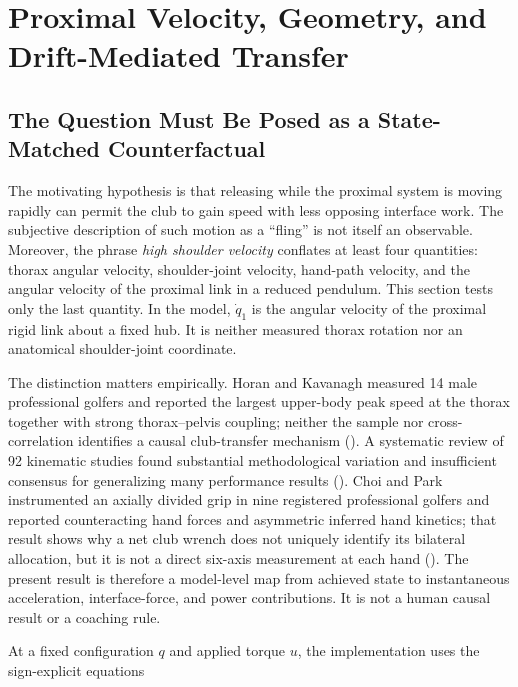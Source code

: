 \documentclass[
  letterpaper,
]{report}
\begin{document}
\chapter{Proximal Velocity, Geometry, and Drift-Mediated
Transfer}\label{sec-shoulder-velocity-transfer}

\section{The Question Must Be Posed as a State-Matched
Counterfactual}\label{the-question-must-be-posed-as-a-state-matched-counterfactual}

The motivating hypothesis is that releasing while the proximal system is
moving rapidly can permit the club to gain speed with less opposing
interface work. The subjective description of such motion as a ``fling''
is not itself an observable. Moreover, the phrase \emph{high shoulder
velocity} conflates at least four quantities: thorax angular velocity,
shoulder-joint velocity, hand-path velocity, and the angular velocity of
the proximal link in a reduced pendulum. This section tests only the
last quantity. In the model, \(\dot q_1\) is the angular velocity of the
proximal rigid link about a fixed hub. It is neither measured thorax
rotation nor an anatomical shoulder-joint coordinate.

The distinction matters empirically. Horan and Kavanagh measured 14 male
professional golfers and reported the largest upper-body peak speed at
the thorax together with strong thorax--pelvis coupling; neither the
sample nor cross-correlation identifies a causal club-transfer mechanism
(). A systematic review
of 92 kinematic studies found substantial methodological variation and
insufficient consensus for generalizing many performance results
(). Choi and Park
instrumented an axially divided grip in nine registered professional
golfers and reported counteracting hand forces and asymmetric inferred
hand kinetics; that result shows why a net club wrench does not uniquely
identify its bilateral allocation, but it is not a direct six-axis
measurement at each hand ().
The present result is therefore a model-level map from achieved state to
instantaneous acceleration, interface-force, and power contributions. It
is not a human causal result or a coaching rule.

At a fixed configuration \(q\) and applied torque \(u\), the
implementation uses the sign-explicit equations
\end{document}

